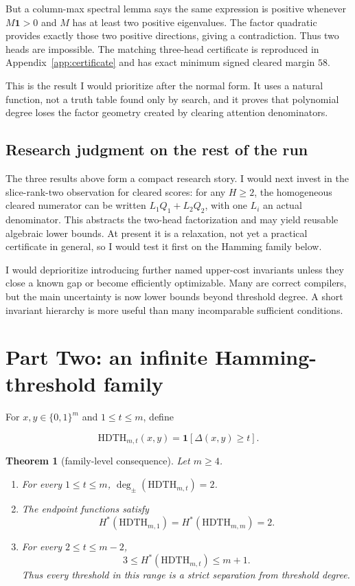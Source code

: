 \documentclass[10pt]{article}
\newtheorem{theorem}{Theorem}
\theoremstyle{definition}
\theoremstyle{remark}
\newcommand{\cube}{\{0,1\}}
\newcommand{\Hstar}{H^{\ast}}
\newcommand{\tdeg}{\deg_{\pm}}
\newcommand{\HDTH}{\mathrm{HDTH}}
\begin{document}
But a column-max spectral lemma says the same expression is positive whenever
$M\mathbf 1>0$ and $M$ has at least two positive eigenvalues. The factor quadratic
provides exactly those two positive directions, giving a contradiction. Thus two heads
are impossible. The matching three-head certificate is reproduced in Appendix~\ref{app:certificate}
and has exact minimum signed cleared margin $58$.

This is the result I would prioritize after the normal form. It uses a natural function,
not a truth table found only by search, and it proves that polynomial degree loses the
factor geometry created by clearing attention denominators.

\subsection{Research judgment on the rest of the run}

The three results above form a compact research story. I would next invest in the
slice-rank-two observation for cleared scores: for any $H\geq2$, the homogeneous cleared
numerator can be written $L_1Q_1+L_2Q_2$, with one $L_i$ an actual denominator. This
abstracts the two-head factorization and may yield reusable algebraic lower bounds.
At present it is a relaxation, not yet a practical certificate in general, so I would test
it first on the Hamming family below.

I would deprioritize introducing further named upper-cost invariants unless they close a
known gap or become efficiently optimizable. Many are correct compilers, but the main
uncertainty is now lower bounds beyond threshold degree. A short invariant hierarchy is
more useful than many incomparable sufficient conditions.

\section{Part Two: an infinite Hamming-threshold family}

For $x,y\in\cube^m$ and $1\leq t\leq m$, define

\[
\HDTH_{m,t}(x,y)=\mathbf 1[\Delta(x,y)\geq t].
\]

\begin{theorem}[family-level consequence]\label{thm:family}
Let $m\geq4$.
\begin{enumerate}[label=(\roman*)]
\item For every $1\leq t\leq m$, $\tdeg(\HDTH_{m,t})=2$.
\item The endpoint functions satisfy
\[
\Hstar(\HDTH_{m,1})=\Hstar(\HDTH_{m,m})=2.
\]
\item For every $2\leq t\leq m-2$,
\[
3\leq\Hstar(\HDTH_{m,t})\leq m+1.
\]
Thus every threshold in this range is a strict separation from threshold degree.
\end{enumerate}
\end{theorem}
\end{document}

